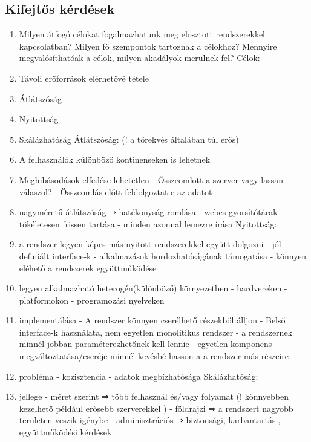 \documentclass[twoside, a4paper, 12pt]{article}
\begin{document}
\subsection{Kifejtős kérdések}
\begin{enumerate}
    \item  Milyen átfogó célokat fogalmazhatunk meg elosztott rendszerekkel kapcsolatban? Milyen fő szempontok tartoznak a célokhoz? Mennyire megvalósíthatóak a célok, milyen akadályok merülnek fel?
        Célok:
    \item Távoli erőforrások elérhetővé tétele
    \item Átlátszóság
    \item Nyitottság
    \item Skálázhatóság
        Átlátszóság: (! a törekvés általában túl erős)
    \item A felhasználók különböző kontinenseken is lehetnek 
    \item Meghibásodások elfedése lehetetlen
        - Összeomlott a szerver vagy lassan válaszol? 
        - Összeomlás előtt feldolgoztat-e az adatot
    \item nagyméretű átlátszóság ⇒ hatékonyság romlása
        - webes gyorsítótárak tökéletesen frissen tartása
        - minden azonnal lemezre írása
        Nyitottság: 
    \item a rendszer legyen képes más nyitott rendszerekkel együtt dolgozni
        - jól definiált interface-k
        - alkalmazások hordozhatóságának támogatása
        - könnyen eléhető a rendszerek együttműködése
    \item legyen alkalmazható heterogén(különböző) környezetben
        - hardvereken
        - platformokon
        - programozási nyelveken
    \item implementálása
        - A rendszer könnyen cserélhető részekből álljon
        - Belső interface-k használata, nem egyetlen monolitikus rendszer
        - a rendszernek minnél jobban paraméterezhetőnek kell lennie
        - egyetlen komponens megváltoztatása/cseréje minnél kevésbé hasson a a rendszer más részeire
    \item probléma
        - kozisztencia
        - adatok megbízhatósága
        Skálázhatóság:
    \item jellege
        - méret szerint   ⇒ több felhasznál és/vagy folyamat  (! könnyebben kezelhető például erősebb szerverekkel )
        - földrajzi       ⇒ a rendszert nagyobb területen veszik igénybe
        - adminisztrációs ⇒ biztonsági, karbantartási, együttműködési kérdések

\end{enumerate}
\end{document}
